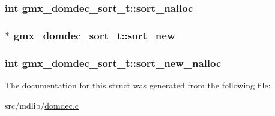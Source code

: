 \hypertarget{structgmx__domdec__sort__t_a2b46ff0dd67a702563a68fc772e5d0ae}{
\subsubsection[{sort\-\_\-nalloc}]{\setlength{\rightskip}{0pt plus 5cm}int {\bf gmx\-\_\-domdec\-\_\-sort\-\_\-t\-::sort\-\_\-nalloc}}}\label{structgmx__domdec__sort__t_a2b46ff0dd67a702563a68fc772e5d0ae}
\hypertarget{structgmx__domdec__sort__t_aea24f9be038e12313854dbf364450a40}{
\subsubsection[{sort\-\_\-new}]{$\ast$ {\bf gmx\-\_\-domdec\-\_\-sort\-\_\-t\-::sort\-\_\-new}}}\label{structgmx__domdec__sort__t_aea24f9be038e12313854dbf364450a40}
\hypertarget{structgmx__domdec__sort__t_a32b8b1b9305295d8d6317caf5477d46a}{
\subsubsection[{sort\-\_\-new\-\_\-nalloc}]{\setlength{\rightskip}{0pt plus 5cm}int {\bf gmx\-\_\-domdec\-\_\-sort\-\_\-t\-::sort\-\_\-new\-\_\-nalloc}}}\label{structgmx__domdec__sort__t_a32b8b1b9305295d8d6317caf5477d46a}


\-The documentation for this struct was generated from the following file\-:\begin{DoxyCompactItemize}
\item 
src/mdlib/\hyperlink{domdec_8c}{domdec.\-c}\end{DoxyCompactItemize}
